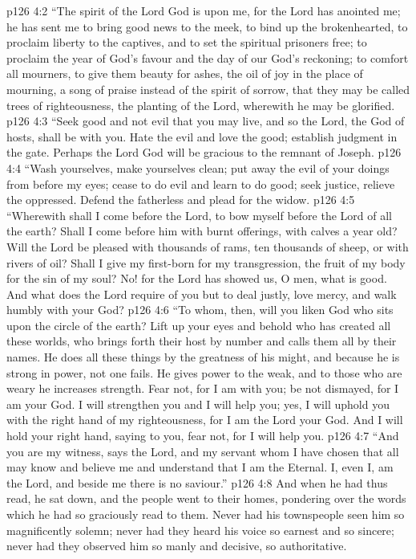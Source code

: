 \vs p126 4:2 \pc “The spirit of the Lord God is upon me, for the Lord has anointed me; he has sent me to bring good news to the meek, to bind up the brokenhearted, to proclaim liberty to the captives, and to set the spiritual prisoners free; to proclaim the year of God’s favour and the day of our God’s reckoning; to comfort all mourners, to give them beauty for ashes, the oil of joy in the place of mourning, a song of praise instead of the spirit of sorrow, that they may be called trees of righteousness, the planting of the Lord, wherewith he may be glorified.
\vs p126 4:3 “Seek good and not evil that you may live, and so the Lord, the God of hosts, shall be with you. Hate the evil and love the good; establish judgment in the gate. Perhaps the Lord God will be gracious to the remnant of Joseph.
\vs p126 4:4 “Wash yourselves, make yourselves clean; put away the evil of your doings from before my eyes; cease to do evil and learn to do good; seek justice, relieve the oppressed. Defend the fatherless and plead for the widow.
\vs p126 4:5 “Wherewith shall I come before the Lord, to bow myself before the Lord of all the earth? Shall I come before him with burnt offerings, with calves a year old? Will the Lord be pleased with thousands of rams, ten thousands of sheep, or with rivers of oil? Shall I give my first\hyp{}born for my transgression, the fruit of my body for the sin of my soul? No! for the Lord has showed us, O men, what is good. And what does the Lord require of you but to deal justly, love mercy, and walk humbly with your God?
\vs p126 4:6 “To whom, then, will you liken God who sits upon the circle of the earth? Lift up your eyes and behold who has created all these worlds, who brings forth their host by number and calls them all by their names. He does all these things by the greatness of his might, and because he is strong in power, not one fails. He gives power to the weak, and to those who are weary he increases strength. Fear not, for I am with you; be not dismayed, for I am your God. I will strengthen you and I will help you; yes, I will uphold you with the right hand of my righteousness, for I am the Lord your God. And I will hold your right hand, saying to you, fear not, for I will help you.
\vs p126 4:7 “And you are my witness, says the Lord, and my servant whom I have chosen that all may know and believe me and understand that I am the Eternal. I, even I, am the Lord, and beside me there is no saviour.”
\vs p126 4:8 \pc And when he had thus read, he sat down, and the people went to their homes, pondering over the words which he had so graciously read to them. Never had his townspeople seen him so magnificently solemn; never had they heard his voice so earnest and so sincere; never had they observed him so manly and decisive, so authoritative.
